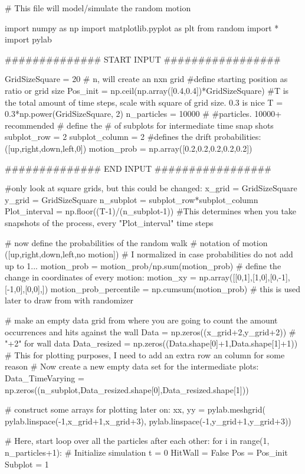 \begin{python}
# This file will model/simulate the random motion

import numpy as np
import matplotlib.pyplot as plt
from random import *
import pylab

############## START INPUT #################

GridSizeSquare = 20 # n, will create an nxn grid
#define starting position as ratio or grid size
Pos_init = np.ceil(np.array([0.4,0.4])*GridSizeSquare)
#T is the total amount of time steps, scale with square of grid size. 0.3 is nice
T = 0.3*np.power(GridSizeSquare, 2)
n_particles = 10000 # #particles. 10000+ recommended
# define the # of subplots for intermediate time snap shots
subplot_row = 2             
subplot_column = 2
#defines the drift probabilities: ([up,right,down,left,0]) 
motion_prob = np.array([0.2,0.2,0.2,0.2,0.2])

############## END INPUT #################

#only look at square grids, but this could be changed:
x_grid = GridSizeSquare
y_grid = GridSizeSquare
n_subplot = subplot_row*subplot_column
Plot_interval = np.floor((T-1)/(n_subplot-1))
#This determines when you take snapshots of the process, every "Plot_interval" time steps

# now define the probabilities of the random walk
# notation of motion ([up,right,down,left,no motion])
# I normalized in case probabilities do not add up to 1...
motion_prob = motion_prob/np.sum(motion_prob)
# define the change in coordinates of every motion:
motion_xy = np.array([[0,1],[1,0],[0,-1],[-1,0],[0,0],])
motion_prob_percentile = np.cumsum(motion_prob)
# this is used later to draw from with randomizer

# make an empty data grid from where you are going to count the amount occurrences and hits against the wall
Data = np.zeros((x_grid+2,y_grid+2)) # "+2" for wall data
Data_resized = np.zeros((Data.shape[0]+1,Data.shape[1]+1))
# This for plotting purposes, I need to add an extra row an column for some reason
# Now create a new empty data set for the intermediate plots:
Data_TimeVarying = np.zeros((n_subplot,Data_resized.shape[0],Data_resized.shape[1]))

# construct some arrays for plotting later on:
xx, yy = pylab.meshgrid(
    pylab.linspace(-1,x_grid+1,x_grid+3),
    pylab.linspace(-1,y_grid+1,y_grid+3))

# Here, start loop over all the particles after each other:
for i in range(1, n_particles+1):
    # Initialize simulation
    t = 0
    HitWall = False
    Pos = Pos_init
    Subplot = 1
    

\end{python}
